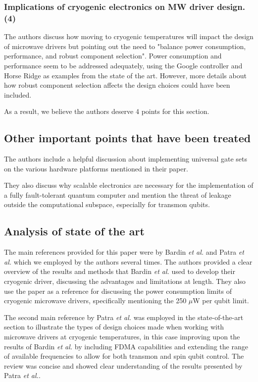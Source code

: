 \documentclass[11pt]{article}
\begin{document}
\subsubsection{Implications of cryogenic electronics on MW driver design. (4)}
\label{sec:org9dd003e}
The authors discuss how moving to cryogenic temperatures will
impact the design of microwave drivers but pointing out the need
to "balance power consumption, performance, and robust component
selection". Power consumption and performance seem to be addressed
adequately, using the Google controller and Horse Ridge as
examples from the state of the art. However, more details about
how robust component selection affects the design choices could
have been included.

As a result, we believe the authors deserve 4 points for this section.

\subsection{Other important points that have been treated}
\label{sec:org90c8a12}
The authors include a helpful discussion about implementing universal
gate sets on the various hardware platforms mentioned in their paper.

They also discuss why scalable electronics are necessary for the
implementation of a fully fault-tolerant quantum computer and mention
the threat of leakage outside the computational subspace, especially
for transmon qubits.

\subsection{Analysis of state of the art}
\label{sec:org43b4637}
The main references provided for this paper were by Bardin \emph{et al.} and
Patra \emph{et al.} which we employed by the authors several times. The
authors provided a clear overview of the results and methods that
Bardin \emph{et al.} used to develop their cryogenic driver, discussing the
advantages and limitations at length. They also use the paper as a
reference for discussing the power consumption limits of cryogenic
microwave drivers, specifically mentioning the 250 $ \mu $W per qubit limit.

The second main reference by Patra \emph{et al.} was employed in the
state-of-the-art section to illustrate the types of design choices made when
working with microwave drivers at cryogenic temperatures, in this case improving
upon the results of Bardin \emph{et al.} by including FDMA capabilities and
extending the range of available frequencies to allow for both transmon and spin
qubit control. The review was concise and showed clear understanding of the
results presented by Patra \emph{et al.}.
\end{document}
